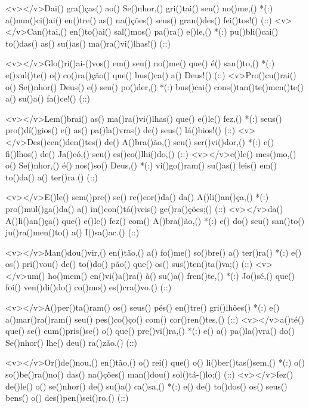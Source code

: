 <v></v>Dai() gra()ças() ao() Se()nhor,() gri()tai() seu() no()me,() *(:)
a()nun()ci()ai() en()tre() as() na()ções() seus() gran()des() fei()tos!() (::)
<v></v>Can()tai,() en()to()ai() sal()mos() pa()ra() e()le,() *(:)
pu()bli()cai() to()das() as() su()as() ma()ra()vi()lhas!() (::)

<v></v>Glo()ri()ai-()vos() em() seu() no()me() que() é() san()to,() *(:)
e()xul()te() o() co()ra()ção() que() bus()ca() a() Deus!() (::)
<v>Pro()cu()rai() o() Se()nhor() Deus() e() seu() po()der,() *(:)
bus()cai() cons()tan()te()men()te() a() su()a() fa()ce!() (::)

<v></v>Lem()brai() as() ma()ra()vi()lhas() que() e()le() fez,() *(:)
seus() pro()dí()gios() e() as() pa()la()vras() de() seus() lá()bios!() (::)
<v></v>Des()cen()den()tes() de() A()bra()ão,() seu() ser()vi()dor,() *(:)
e() fi()lhos() de() Ja()có,() seu() es()co()lhi()do,() (::)
<v></v>e()le() mes()mo,() o() Se()nhor,() é() nos()so() Deus,() *(:)
vi()go()ram() su()as() leis() em() to()da() a() ter()ra.() (::)

<v></v>E()le() sem()pre() se() re()cor()da() da() A()li()an()ça,() *(:)
pro()mul()ga()da() a() in()con()tá()veis() ge()ra()ções;() (::)
<v></v>da() A()li()an()ça() que() e()le() fez() com() A()bra()ão,() *(:)
e() do() seu() san()to() ju()ra()men()to() a() I()sa()ac.() (::)



<v></v>Man()dou()vir,() en()tão,() a() fo()me() so()bre() a() ter()ra() *(:)
e() os() pri()vou() de() to()do() pão() que() os() sus()ten()ta()va;() (::)
<v></v>um() ho()mem() en()vi()a()ra() à() su()a() fren()te,() *(:)
Jo()sé,() que() foi() ven()di()do() co()mo() es()cra()vo.() (::)

<v></v>A()per()ta()ram() os() seus() pés() en()tre() gri()lhões() *(:)
e() a()mar()ra()ram() seu() pes()co()ço() com() cor()ren()tes,() (::)
<v></v>a()té() que() se() cum()pris()se() o() que() pre()vi()ra,() *(:)
e() a() pa()la()vra() do() Se()nhor() lhe() deu() ra()zão.() (::)

<v></v>Or()de()nou,() en()tão,() o() rei() que() o() li()ber()tas()sem,() *(:)
o() so()be()ra()no() das() na()ções() man()dou() sol()tá-()lo;() (::)
<v></v>fez() de()le() o() se()nhor() de() su()a() ca()sa,() *(:)
e() de() to()dos() os() seus() bens() o() des()pen()sei()ro.() (::)